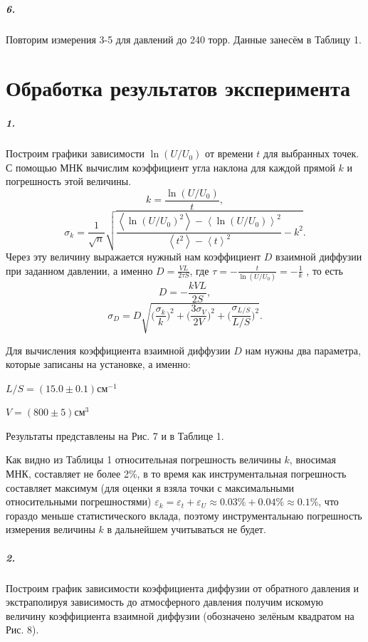 \documentclass[a4paper,12pt]{article}
\begin{document}
\subparagraph*{6.} Повторим измерения 3-5 для давлений до 240 торр.  Данные занесём в Таблицу 1.

\newpage

\section*{Обработка результатов эксперимента}

\subparagraph*{1.} Построим графики зависимости $\ln (U / U_0)$ от времени $t$ для выбранных точек. С помощью МНК вычислим коэффициент угла наклона для каждой прямой $k$ и погрешность этой величины.
$$k = \frac{\ln(U/U_0)}{t},$$
 $$\sigma_k = \frac{1}{\sqrt{n}}\sqrt{\frac{\left<\ln (U/U_0)^2\right>-\left<\ln (U/U_0)\right>^2}{\left<t^2\right>-\left<t\right>^2}-k^2}.$$ 
  Через эту величину выражается нужный нам коэффициент $D$ взаимной диффузии при заданном давлении, а именно $D = \frac{VL}{2\tau S}$, где $\tau = -\frac{t}{\ln (U/U_0)}=-\frac{1}{k}$ , то есть 
  $$D = -\frac{kVL}{2S},$$ 
  $$\sigma_D = D \sqrt{\big(\frac{\sigma_k}{k}\big)^2 + \big(\frac{3\sigma_V }{2V}\big)^2 + \big(\frac{\sigma_{L/S}}{L/S}\big)^2}.$$
  
  Для вычисления коэффициента взаимной диффузии $D$ нам нужны два параметра, которые записаны на установке, а именно:
  
  $  L/ S = (15.0 \pm 0.1) см^{-1}$ 
 
 
  $V = (800 \pm 5) см^3$
  
  
  Результаты представлены на Рис. 7 и в Таблице 1.
  
Как видно из Таблицы 1 относительная погрешность величины $k$, вносимая МНК, составляет не более 2\%, в то время как инструментальная погрешность составляет максимум (для оценки я взяла точки с максимальными относительными погрешностями) $\varepsilon_k = \varepsilon_t + \varepsilon_U \approx  0.03\% + 0.04\% \approx 0.1\%$, что гораздо меньше статистического вклада, поэтому инструментальнаю погрешность измерения величины $k$  в дальнейшем учитываться не будет. 





\subparagraph*{2.}


Построим график зависимости коэффициента диффузии от обратного давления и экстраполируя зависимость до атмосферного давления получим искомую величину коэффициента взаимной диффузии (обозначено зелёным  квадратом на Рис. 8). 
 \newpage
\end{document}
